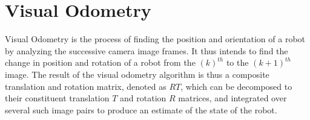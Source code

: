 \section{Visual Odometry}

Visual Odometry is the process of finding the position and orientation of a robot by analyzing the successive camera image frames. It thus intends to find the change in position and rotation of a robot from the \((k)^{th}\) to the \((k+1)^{th}\) image. The result of the visual odometry algorithm is thus a composite translation and rotation matrix, denoted as \(RT\), which can be decomposed to their constituent translation \(T\) and rotation \(R\) matrices, and integrated over several such image pairs to produce an estimate of the state of the robot.

